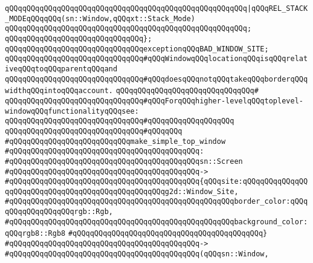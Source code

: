 \verb|qQQqqQQqqQQqqQQqqQQqqQQqqQQqqQQqqQQqqQQqqQQqqQQqqQQqqQQq|\verb#|qQQqREL_STACK_MODEqQQqqQQq(sn::Window,qQQqxt::Stack_Mode)#\newline
\verb|qQQqqQQqqQQqqQQqqQQqqQQqqQQqqQQqqQQqqQQqqQQqqQQqqQQqqQQq;|\newline
\verb|qQQqqQQqqQQqqQQqqQQqqQQqqQQqqQQq};|\newline
\newline
\verb|qQQqqQQqqQQqqQQqqQQqqQQqqQQqqQQqexceptionqQQqBAD_WINDOW_SITE;|\newline
\newline
\verb|qQQqqQQqqQQqqQQqqQQqqQQqqQQqqQQq#qQQqWindowqQQqlocationqQQqisqQQqrelativeqQQqtoqQQqparentqQQqand|\newline
\verb|qQQqqQQqqQQqqQQqqQQqqQQqqQQqqQQq#qQQqdoesqQQqnotqQQqtakeqQQqborderqQQqwidthqQQqintoqQQqaccount.|\newline
\verb|qQQqqQQqqQQqqQQqqQQqqQQqqQQqqQQq#|\newline
\verb|qQQqqQQqqQQqqQQqqQQqqQQqqQQqqQQq#qQQqForqQQqhigher-levelqQQqtoplevel-windowqQQqfunctionalityqQQqsee:|\newline
\verb|qQQqqQQqqQQqqQQqqQQqqQQqqQQqqQQq#qQQqqQQqqQQqqQQqqQQq|\newline
\verb|qQQqqQQqqQQqqQQqqQQqqQQqqQQqqQQq#qQQqqQQq|\newline
\verb|#qQQqqQQqqQQqqQQqqQQqqQQqqQQqmake_simple_top_window|\newline
\verb|#qQQqqQQqqQQqqQQqqQQqqQQqqQQqqQQqqQQqqQQqqQQq:|\newline
\verb|#qQQqqQQqqQQqqQQqqQQqqQQqqQQqqQQqqQQqqQQqqQQqsn::Screen|\newline
\verb|#qQQqqQQqqQQqqQQqqQQqqQQqqQQqqQQqqQQqqQQqqQQq->|\newline
\verb|#qQQqqQQqqQQqqQQqqQQqqQQqqQQqqQQqqQQqqQQqqQQq{qQQqsite:qQQqqQQqqQQqqQQqqQQqqQQqqQQqqQQqqQQqqQQqqQQqqQQqqQQqg2d::Window_Site,|\newline
\verb|#qQQqqQQqqQQqqQQqqQQqqQQqqQQqqQQqqQQqqQQqqQQqqQQqqQQqborder_color:qQQqqQQqqQQqqQQqqQQqrgb::Rgb,|\newline
\verb|#qQQqqQQqqQQqqQQqqQQqqQQqqQQqqQQqqQQqqQQqqQQqqQQqqQQqbackground_color:qQQqrgb8::Rgb8|\newline
\verb|#qQQqqQQqqQQqqQQqqQQqqQQqqQQqqQQqqQQqqQQqqQQq}|\newline
\verb|#qQQqqQQqqQQqqQQqqQQqqQQqqQQqqQQqqQQqqQQqqQQq->|\newline
\verb|#qQQqqQQqqQQqqQQqqQQqqQQqqQQqqQQqqQQqqQQqqQQq(qQQqsn::Window,|\newline
